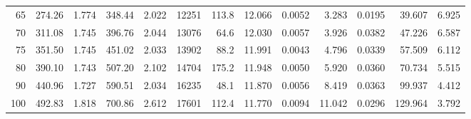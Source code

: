 \documentclass[10pt]{article}
\begin{document}
{\begin{tabular}{|r|rr|rr|rr|rr|rr|r|r|}
       65 &       274.26 &        1.774 &       348.44 &        2.022 &        12251 &        113.8 &       12.066 &       0.0052 &        3.283 &       0.0195 &       39.607 &        6.925 \\
       70 &       311.08 &        1.745 &       396.76 &        2.044 &        13076 &         64.6 &       12.030 &       0.0057 &        3.926 &       0.0382 &       47.226 &        6.587 \\
       75 &       351.50 &        1.745 &       451.02 &        2.033 &        13902 &         88.2 &       11.991 &       0.0043 &        4.796 &       0.0339 &       57.509 &        6.112 \\
       80 &       390.10 &        1.743 &       507.20 &        2.102 &        14704 &        175.2 &       11.948 &       0.0050 &        5.920 &       0.0360 &       70.734 &        5.515 \\
       90 &       440.96 &        1.727 &       590.51 &        2.034 &        16235 &         48.1 &       11.870 &       0.0056 &        8.419 &       0.0363 &       99.937 &        4.412 \\
      100 &       492.83 &        1.818 &       700.86 &        2.612 &        17601 &        112.4 &       11.770 &       0.0094 &       11.042 &       0.0296 &      129.964 &        3.792 \\
\hline
\end{tabular}
}







\pagebreak
\end{document}
